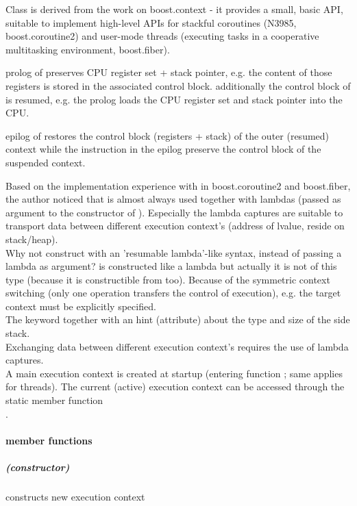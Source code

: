 Class \ectx is derived from the work on boost.context\cite{bcontext} - it
provides a small, basic API, suitable to implement high-level APIs for stackful
coroutines (N3985\cite{N3985}, boost.coroutine2\cite{bcoroutine2}) and user-mode
threads (executing tasks in a cooperative multitasking environment,
boost.fiber\cite{bfiber}).

prolog of  preserves CPU register set + stack pointer, e.g.
the content of those registers is stored in the associated control block. additionally the
control block of  is resumed, e.g. the prolog loads the CPU register set and stack pointer
into the CPU.

epilog of  restores the control block (registers + stack) of
the outer (resumed) context while the instruction in the epilog preserve the control block
of the suspended context.

Based on the implementation experience with  in
boost.coroutine2\cite{bcoroutine2} and boost.fiber\cite{bfiber}, the author
noticed that  is almost always used together with lambdas
(passed as argument to the constructor of ). Especially
the lambda captures are suitable to transport data between different execution
context's (address of lvalue, reside on stack/heap).\\
Why not construct \ectx with an 'resumable lambda'-like syntax, instead of
passing a lambda as argument? \ectx is constructed like a lambda but actually it
is not of this type (because it is constructible from \ectxcurrent too).
Because of the symmetric context switching (only one operation transfers the
control of execution), e.g. the target context must be explicitly specified.\\
The keyword \resumable together with an hint (attribute) about the type and size
of the side stack.\\
Exchanging data between different execution context's requires the use of lambda
captures.\\
A main execution context is created at startup (entering function \main; same
applies for threads). The current (active) execution context can be accessed
through the static member function\\
\ectxcurrent.

\paragraph*{member functions}
\subparagraph*{(constructor)}
constructs new execution context\\

